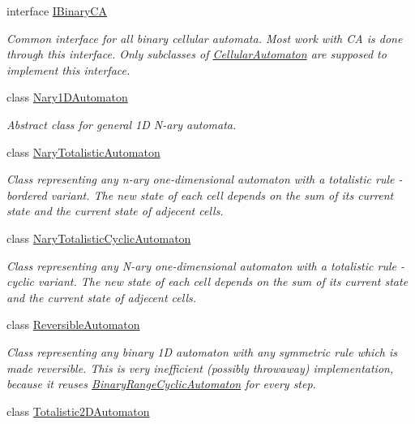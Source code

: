 \begin{DoxyCompactItemize}
interface \hyperlink{interface_cellular_1_1_i_binary_c_a}{I\+Binary\+C\+A}
\begin{DoxyCompactList}\small\item\em Common interface for all binary cellular automata. Most work with C\+A is done through this interface. Only subclasses of {\ttfamily \hyperlink{class_cellular_1_1_cellular_automaton}{Cellular\+Automaton}} are supposed to implement this interface. \end{DoxyCompactList}\item 
class \hyperlink{class_cellular_1_1_nary1_d_automaton}{Nary1\+D\+Automaton}
\begin{DoxyCompactList}\small\item\em Abstract class for general 1\+D N-\/ary automata. \end{DoxyCompactList}\item 
class \hyperlink{class_cellular_1_1_nary_totalistic_automaton}{Nary\+Totalistic\+Automaton}
\begin{DoxyCompactList}\small\item\em Class representing any n-\/ary one-\/dimensional automaton with a totalistic rule -\/ bordered variant. The new state of each cell depends on the sum of its current state and the current state of adjecent cells. \end{DoxyCompactList}\item 
class \hyperlink{class_cellular_1_1_nary_totalistic_cyclic_automaton}{Nary\+Totalistic\+Cyclic\+Automaton}
\begin{DoxyCompactList}\small\item\em Class representing any N-\/ary one-\/dimensional automaton with a totalistic rule -\/ cyclic variant. The new state of each cell depends on the sum of its current state and the current state of adjecent cells. \end{DoxyCompactList}\item 
class \hyperlink{class_cellular_1_1_reversible_automaton}{Reversible\+Automaton}
\begin{DoxyCompactList}\small\item\em Class representing any binary 1\+D automaton with any symmetric rule which is made reversible. This is very inefficient (possibly throwaway) implementation, because it reuses {\ttfamily \hyperlink{class_cellular_1_1_binary_range_cyclic_automaton}{Binary\+Range\+Cyclic\+Automaton}} for every step. \end{DoxyCompactList}\item 
class \hyperlink{class_cellular_1_1_totalistic2_d_automaton}{Totalistic2\+D\+Automaton}

\end{DoxyCompactItemize}
